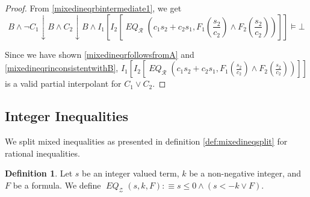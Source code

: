 \documentclass[a4paper]{article}
\theoremstyle{definition}
\newtheorem{definition}{Definition}
\newcommand\restrictB{\downarrow B}
\newcommand\defas{:\equiv}
\newcommand\mR{\mathcal{R}}
\newcommand\mZ{\mathcal{Z}}
\newcommand\meq{\mathop{\mathit{EQ}}\nolimits}
\newcommand\meqr{\meq_\mR}
\newcommand\meqz{\meq_\mZ}
\begin{document}
\begin{proof}
  From \ref{mixedineqrbintermediate1}, we get
  \[
  B\wedge\neg C_1\restrictB\wedge C_2\restrictB\wedge I_1[I_2[\meqr(c_1s_2+c_2s_1,F_1(\frac{s_2}{c_2})\wedge F_2(\frac{s_2}{c_2}))]]\models\bot
  \]

  Since we have shown \ref{mixedineqrfollowsfromA} and \ref{mixedineqrinconsistentwithB}, $I_1[I_2[\meqr(c_1s_2+c_2s_1,F_1(\frac{s_2}{c_2})\wedge F_2(\frac{s_2}{c_2}))]]$ is a valid partial interpolant for $C_1\vee C_2$.
\end{proof}

\subsection{Integer Inequalities}
We split mixed inequalities as presented in definition \ref{def:mixedineqsplit} for rational inequalities.
\begin{definition}
  Let $s$ be an integer valued term, $k$ be a non-negative integer, and $F$ be a formula. We define $\meqz(s,k,F)\defas s\le0\wedge(s<-k\vee F)$.
\end{definition}
\end{document}
